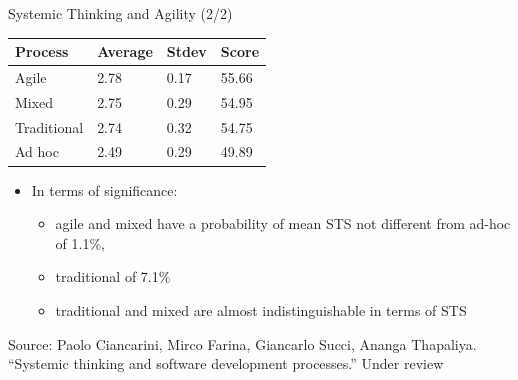\documentclass{beamer}
\begin{document}
\begin{frame}
{\centerline{Systemic Thinking and Agility (2/2)}}

\begin{center}
\begin{tabular}{|l|l|l|l|}
\midrule
\textbf{Process}             & \textbf{Average} &  \textbf{Stdev} &  \textbf{Score} \\ \midrule
Agile       & 2.78 & 0.17    & 55.66 \\ \midrule
Mixed  & 2.75 & 0.29    & 54.95 \\ \midrule
Traditional   & 2.74  & 0.32   & 54.75 \\ \midrule
Ad hoc            & 2.49 & 0.29    & 49.89 \\ \midrule
\end{tabular}

\end{center}
\begin{itemize}
\item In terms of significance:
\begin{itemize}
    \item agile and mixed have a probability of mean STS not different from ad-hoc of 1.1\%,
    \item traditional of 7.1\%
    \item traditional and mixed are almost indistinguishable in terms of STS
\end{itemize}
\end{itemize}

\begin{center}
    \tiny{Source: Paolo Ciancarini, Mirco Farina, Giancarlo Succi, Ananga Thapaliya. ``Systemic thinking and software development processes.'' Under review}
\end{center}

\end{frame}
\end{document}
